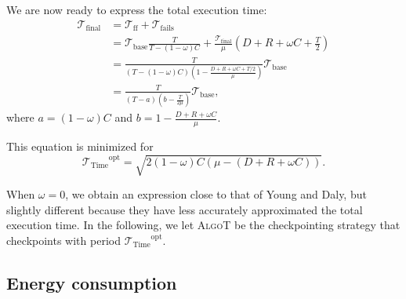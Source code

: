 \documentclass[a4paper]{article}
\newcommand{\ema}[1]{\ensuremath{#1}\xspace}
\newcommand{\ccc}{\ema{C}}
\newcommand{\rrr}{\ema{R}}
\newcommand{\ddd}{\ema{D}}
\newcommand{\period}{T}
\renewcommand{\time}[1][]{\ema{\mathcal{T}_{\text{#1}}}}
\newcommand{\tbase}{\time[base]}
\newcommand{\tff}{\time[ff]}
\newcommand{\tfails}{\time[fails]}
\newcommand{\tfin}{\time[final]}
\newcommand{\toptT}{\ema{\time[Time]^{\text{opt}}}}
\newcommand{\workduringckpt}{\omega}
\newcommand{\algoT}{\textsc{AlgoT}\xspace}
\begin{document}
We are now ready to express the total execution time: \\[-.5cm]
\begin{align*}
\tfin 
&= \tff + \tfails \\
 &= \tbase\frac{\period}{\period - (1- \workduringckpt)\ccc} + \frac{\tfin}{\mu}\left ( \ddd + \rrr + \workduringckpt \ccc + \frac{\period}{2} \right ) \\
 &= \frac{\period}{\left ( \period- (1-\workduringckpt)\ccc \right ) \left ( 1- \frac{\ddd + \rrr + \workduringckpt \ccc + \period /2}{\mu}\right )}\tbase\\
 &= \frac{\period}{\left ( \period- a \right ) \left ( b - \frac{\period}{2\mu} \right )}\tbase ,
\end{align*}
where $a= (1-\workduringckpt)\ccc$ and $b=  1- \frac{\ddd + \rrr + \workduringckpt \ccc }{\mu}$.  

\smallskip
This equation is minimized for  
\begin{equation}
\toptT = \sqrt{2(1-\workduringckpt)\ccc(\mu - (\ddd + \rrr +\workduringckpt \ccc))}. 
\label{sol.for.time}
\end{equation}

When $\workduringckpt=0$, we obtain an expression close to that of Young and Daly,
but slightly different because they have less accurately approximated the total execution time.  
In the following, we let \algoT be the checkpointing strategy that checkpoints with period \toptT.

\subsection{Energy consumption}
\label{sec.efin}
\end{document}
